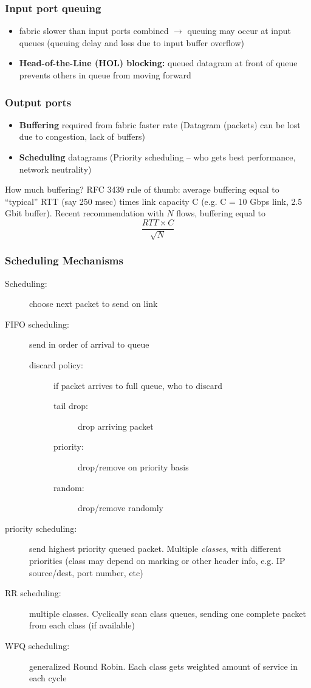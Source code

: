 \subsubsection{Input port queuing}
\begin{itemize}
	\item fabric slower than input ports combined $\rightarrow$ queuing may occur at input queues (queuing delay and loss due to input buffer overflow)
	\item \textbf{Head-of-the-Line (HOL) blocking:} queued datagram at front of queue prevents others in queue from moving forward
\end{itemize}
\subsubsection{Output ports}
\begin{itemize}
	\item \textbf{Buffering} required from fabric faster rate (Datagram (packets) can be lost due to congestion, lack of buffers)
	\item \textbf{Scheduling} datagrams (Priority scheduling -- who gets best performance, network neutrality)
\end{itemize}
\begin{note}{How much buffering?}
	RFC 3439 rule of thumb: average buffering equal to ``typical'' RTT (say 250 msec) times link capacity C (e.g. C = 10 Gbps link, 2.5 Gbit buffer). Recent recommendation with $N$ flows, buffering equal to $$\frac{RTT\times C}{\sqrt{N}}$$
\end{note}
\subsubsection{Scheduling Mechanisms}
\begin{description}
	\item[Scheduling:] choose next packet to send on link
	\item[FIFO scheduling:] send in order of arrival to queue
	\begin{description}
		\item[discard policy:] if packet arrives to full queue, who to discard
		\begin{description}
			\item[tail drop:] drop arriving packet
			\item[priority:] drop/remove on priority basis
			\item[random:] drop/remove randomly
		\end{description}
	\end{description}
	\item[priority scheduling:] send highest priority queued packet. Multiple \textit{classes}, with different priorities (class may depend on marking or other header info, e.g. IP source/dest, port number, etc)
	\item[RR scheduling:] multiple classes. Cyclically scan class queues, sending one complete packet from each class (if available)
	\item[WFQ scheduling:] generalized Round Robin. Each class gets weighted amount of service in each cycle
\end{description}

